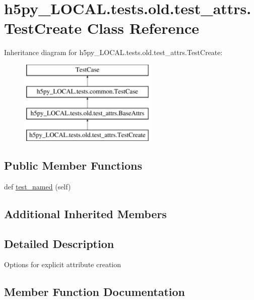 \hypertarget{classh5py__LOCAL_1_1tests_1_1old_1_1test__attrs_1_1TestCreate}{}\section{h5py\+\_\+\+L\+O\+C\+A\+L.\+tests.\+old.\+test\+\_\+attrs.\+Test\+Create Class Reference}
\label{classh5py__LOCAL_1_1tests_1_1old_1_1test__attrs_1_1TestCreate}
Inheritance diagram for h5py\+\_\+\+L\+O\+C\+A\+L.\+tests.\+old.\+test\+\_\+attrs.\+Test\+Create\+:\begin{figure}[H]
\begin{center}
\leavevmode
\includegraphics[height=4.000000cm]{classh5py__LOCAL_1_1tests_1_1old_1_1test__attrs_1_1TestCreate}
\end{center}
\end{figure}
\subsection*{Public Member Functions}
\begin{DoxyCompactItemize}
\item 
def \hyperlink{classh5py__LOCAL_1_1tests_1_1old_1_1test__attrs_1_1TestCreate_a130fda1c6492d869795eac0654fbf205}{test\+\_\+named} (self)
\end{DoxyCompactItemize}
\subsection*{Additional Inherited Members}


\subsection{Detailed Description}
\begin{DoxyVerb}    Options for explicit attribute creation
\end{DoxyVerb}
 

\subsection{Member Function Documentation}
\mbox{\label{classh5py__LOCAL_1_1tests_1_1old_1_1test__attrs_1_1TestCreate_a130fda1c6492d869795eac0654fbf205}} 

